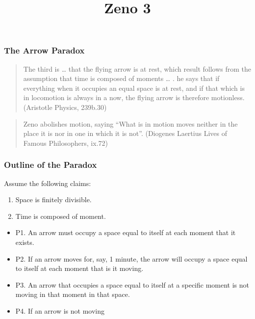 \documentclass[]{article}
\title{Zeno 3}
\date{}
\begin{document}
\maketitle

\subsubsection{The Arrow Paradox}\label{the-arrow-paradox}

\begin{quote}
The third is \ldots{} that the flying arrow is at rest, which result
follows from the assumption that time is composed of moments \ldots{} .
he says that if everything when it occupies an equal space is at rest,
and if that which is in locomotion is always in a now, the flying arrow
is therefore motionless. (Aristotle Physics, 239b.30)
\end{quote}

\begin{quote}
Zeno abolishes motion, saying ``What is in motion moves neither in the
place it is nor in one in which it is not''. (Diogenes Laertius Lives of
Famous Philosophers, ix.72)
\end{quote}

\subsubsection{Outline of the Paradox}\label{outline-of-the-paradox}

Assume the following claims:

\begin{enumerate}
\def\labelenumi{\arabic{enumi}.}
\itemsep1pt\parskip0pt
\item
  Space is finitely divisible.
\item
  Time is composed of moment.
\end{enumerate}

\begin{itemize}
\itemsep1pt\parskip0pt
\item
  P1. An arrow must occupy a space equal to itself at each moment that
  it exists.
\item
  P2. If an arrow moves for, say, 1 minute, the arrow will occupy a
  space equal to itself at each moment that is it moving.
\item
  P3. An arrow that occupies a space equal to itself at a specific
  moment is not moving in that moment in that space.
\item
  P4. If an arrow is not moving
\end{itemize}
\end{document}
